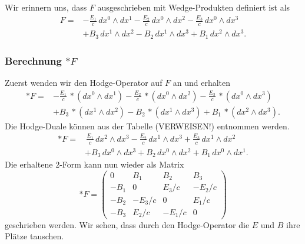 Wir erinnern uns, dass $F$ ausgeschrieben mit Wedge-Produkten definiert ist als
\begin{align*}
	F = 
	& - \frac{E_{1}}{c} \, dx^0 \wedge dx^1 - \frac{E_{2}}{c} \, dx^0 \wedge dx^2 - \frac{E_{3}}{c} \, dx^0 \wedge dx^3 \\
	& + B_3 \, dx^1 \wedge dx^2 - B_2 \, dx^1 \wedge dx^3 + B_1 \, dx^2 \wedge dx^3.
\end{align*}
\subsubsection{Berechnung $\ast F$}
Zuerst wenden wir den Hodge-Operator auf $F$ an und erhalten
\begin{align*}
	\ast F =
	& - \frac{E_{1}}{c} \, {\ast}(dx^0 \wedge dx^1) - \frac{E_{2}}{c} \, {\ast}(dx^0 \wedge dx^2) - \frac{E_{3}}{c} \, {\ast}(dx^0 \wedge dx^3) \\
	& + B_3 \, {\ast}(dx^1 \wedge dx^2) - B_2 \, {\ast}(dx^1 \wedge dx^3) + B_1 \, {\ast}(dx^2 \wedge dx^3).
\end{align*}
Die Hodge-Duale können aus der Tabelle (VERWEISEN!) entnommen werden.
\begin{align*}
	\ast F =
	& \, \frac{E_{1}}{c} \, dx^2 \wedge dx^3 - \frac{E_{2}}{c} \, dx^1 \wedge dx^3 + \frac{E_{3}}{c} \, dx^1 \wedge dx^2 \\
	& + B_3 \, dx^0 \wedge dx^3 + B_2 \, dx^0 \wedge dx^2 + B_1 \, dx^0 \wedge dx^1.
\end{align*}
Die erhaltene 2-Form kann nun wieder als Matrix
\begin{equation}
	\ast F = \begin{pmatrix}
		0 & B_1 & B_2 & B_3 \\ -B_1 & 0 & E_3/c & -E_2/c \\ -B_2 & -E_3/c & 0 & E_1/c \\ -B_3 & E_2/c & -E_1/c & 0 
	\end{pmatrix}
\end{equation}
geschrieben werden.
Wir sehen, dass durch den Hodge-Operator die $E$ und $B$ ihre Plätze tauschen.
